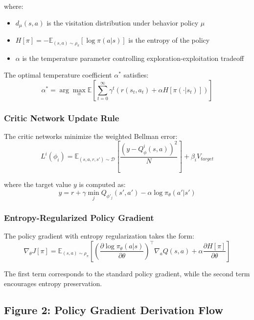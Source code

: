 \documentclass[10pt,a4paper,twocolumn]{article}
\begin{document}
where:
\begin{itemize}
    \item $d_\mu(s,a)$ is the visitation distribution under behavior policy $\mu$
    \item $H[\pi] = -\mathbb{E}_{(s,a) \sim \rho_\pi}[\log\pi(a|s)]$ is the entropy of the policy
    \item $\alpha$ is the temperature parameter controlling exploration-exploitation tradeoff
\end{itemize}

The optimal temperature coefficient $\alpha^*$ satisfies:
\begin{equation}
    \alpha^* = \arg\max_\alpha \mathbb{E}\left[\sum_{t=0}^\infty \gamma^t (r(s_t,a_t) + \alpha H[\pi(\cdot|s_t)])\right]
\end{equation}

\subsubsection*{Critic Network Update Rule}

The critic networks minimize the weighted Bellman error:
\begin{equation}
    L^i(\phi_i) = \mathbb{E}_{(s,a,r,s') \sim \mathcal{D}}\left[\frac{(y - Q_\phi^i(s,a))^2}{N}\right] + \beta_i V_{target}
\end{equation}

where the target value $y$ is computed as:
\begin{equation}
    y = r + \gamma\min_j Q_{\phi'_j}(s',a') - \alpha\log\pi_\theta(a'|s')
\end{equation}

\subsubsection*{Entropy-Regularized Policy Gradient}

The policy gradient with entropy regularization takes the form:
\begin{equation}
    \nabla_\theta J[\pi] = \mathbb{E}_{(s,a) \sim \rho_\pi}\left[\left(\frac{\partial \log\pi_\theta(a|s)}{\partial \theta}\right)^\top\nabla_a Q(s,a) + \alpha\frac{\partial H[\pi]}{\partial \theta}\right]
\end{equation}

The first term corresponds to the standard policy gradient, while the second term encourages entropy preservation.

\subsection*{Figure 2: Policy Gradient Derivation Flow}
\end{document}

